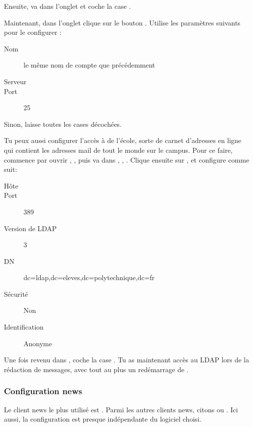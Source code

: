 Ensuite, va dans l'onglet  et coche la case
.


Maintenant, dans l'onglet  clique sur le
bouton . Utilise les paramètres suivants pour le
configurer :
\begin{description}
  \item[Nom] le m\^eme nom de compte que précédemment
  \item[Serveur] 
  \item[Port] 25
\end{description}
Sinon, laisse toutes les cases décochées.

\par Tu peux aussi configurer l'accès à  de l'école, sorte de carnet d'adresses en ligne qui contient les adresses mail de tout le monde sur le campus. Pour ce faire, commence par ouvrir , , puis va dans , , . Clique ensuite sur , et configure comme suit:
\begin{description}
  \item[Hôte] 
  \item[Port] 389
  \item[Version de LDAP] 3
  \item[DN] dc=ldap,dc=eleves,dc=polytechnique,dc=fr
  \item[Sécurité] Non
  \item[Identification] Anonyme
\end{description}
Une fois revenu dans , coche la case . Tu as maintenant accès au LDAP lors de la
rédaction de messages, avec tout au plus un redémarrage de . 

\subsubsection{Configuration news}
 Le client news le plus
utilisé est . Parmi les autres clients news, citons
 ou . Ici aussi, la configuration est
presque indépendante du logiciel choisi.

